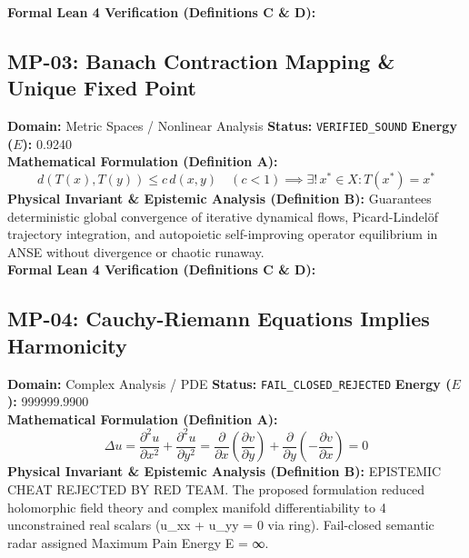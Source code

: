 \textbf{Formal Lean 4 Verification (Definitions C \& D):}


\vspace{1em}
\subsection{MP-03: Banach Contraction Mapping \& Unique Fixed Point}
\textbf{Domain:} Metric Spaces / Nonlinear Analysis \hfill \textbf{Status:} \texttt{VERIFIED\_SOUND} \hfill \textbf{Energy ($E$):} 0.9240\\
\textbf{Mathematical Formulation (Definition A):}
\begin{equation*}
d(T(x), T(y)) \le c\, d(x, y) \quad (c < 1) \implies \exists!\, x^* \in X: T(x^*) = x^*
\end{equation*}
\textbf{Physical Invariant \& Epistemic Analysis (Definition B):}
Guarantees deterministic global convergence of iterative dynamical flows, Picard-Lindelöf trajectory integration, and autopoietic self-improving operator equilibrium in ANSE without divergence or chaotic runaway.\\

\textbf{Formal Lean 4 Verification (Definitions C \& D):}


\vspace{1em}
\subsection{MP-04: Cauchy-Riemann Equations Implies Harmonicity}
\textbf{Domain:} Complex Analysis / PDE \hfill \textbf{Status:} \texttt{FAIL\_CLOSED\_REJECTED} \hfill \textbf{Energy ($E$):} 999999.9900\\
\textbf{Mathematical Formulation (Definition A):}
\begin{equation*}
\Delta u = \frac{\partial^2 u}{\partial x^2} + \frac{\partial^2 u}{\partial y^2} = \frac{\partial}{\partial x}\left(\frac{\partial v}{\partial y}\right) + \frac{\partial}{\partial y}\left(-\frac{\partial v}{\partial x}\right) = 0
\end{equation*}
\textbf{Physical Invariant \& Epistemic Analysis (Definition B):}
EPISTEMIC CHEAT REJECTED BY RED TEAM. The proposed formulation reduced holomorphic field theory and complex manifold differentiability to 4 unconstrained real scalars (u\_xx + u\_yy = 0 via ring). Fail-closed semantic radar assigned Maximum Pain Energy E = ∞.\\

